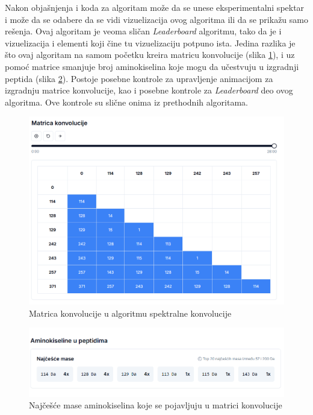 \documentclass[12pt,oneside]{memoir}
\begin{document}
Nakon objašnjenja i koda za algoritam može da se unese eksperimentalni spektar i može da se odabere da se vidi vizuelizacija ovog algoritma ili da se prikažu samo rešenja. Ovaj algoritam je veoma sličan \emph{Leaderboard} algoritmu, tako da je i vizuelizacija i elementi koji čine tu vizuelizaciju potpuno ista. Jedina razlika je što ovaj algoritam na samom početku kreira matricu konvolucije (slika \ref{fig:convolution_2}), i uz pomoć matrice smanjuje broj aminokiselina koje mogu da učestvuju u izgradnji peptida (slika \ref{fig:convolution_3}). Postoje posebne kontrole za upravljenje animacijom za izgradnju matrice konvolucije, kao i posebne kontrole za \emph{Leaderboard} deo ovog algoritma. Ove kontrole su slične onima iz prethodnih algoritama.

\begin{figure}[H]
\centering
\includegraphics[width=1\textwidth]{images/convolution_2.png}
\caption{Matrica konvolucije u algoritmu spektralne konvolucije}
\label{fig:convolution_2}
\end{figure}

\begin{figure}[H]
\centering
\includegraphics[width=1\textwidth]{images/convolution_3.png}
\caption{Najčešće mase aminokiselina koje se pojavljuju u matrici konvolucije}
\label{fig:convolution_3}
\end{figure}
\end{document}
